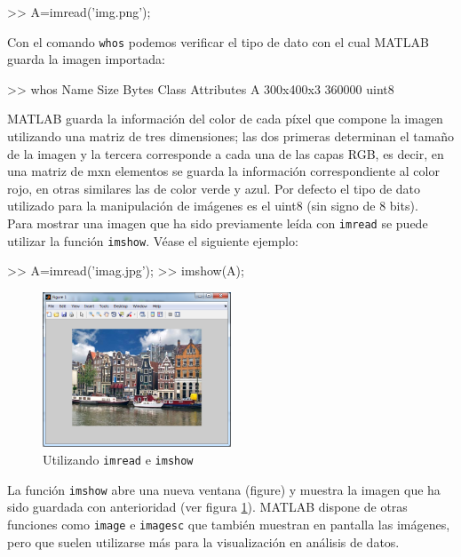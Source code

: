\begin{matlab}
>> A=imread('img.png');
\end{matlab}

Con el comando \texttt{whos} podemos verificar el tipo de dato con el
cual MATLAB guarda la imagen importada:

\begin{matlab}
>> whos
  Name        Size                Bytes  Class    Attributes
  A         300x400x3            360000  uint8    
\end{matlab}

MATLAB guarda la información del color de cada píxel que compone la
imagen utilizando una matriz de tres dimensiones; las dos primeras
determinan el tamaño de la imagen y la tercera corresponde a cada una de
las capas RGB, es decir, en una matriz de mxn elementos se guarda la
información correspondiente al color rojo, en otras similares las de
color verde y azul. Por defecto el tipo de dato utilizado para la
manipulación de imágenes es el uint8 (sin signo de 8 bits). \\

Para mostrar una imagen que ha sido previamente leída con \texttt{imread} se
puede utilizar la función \texttt{imshow}. Véase el siguiente ejemplo:

\begin{matlab}
>> A=imread('imag.jpg');
>> imshow(A);
\end{matlab}

\begin{figure}[htbp]
    \centering
    \includegraphics[width=0.5\textwidth]{images/ch7/holland_imshow.png}
    \caption{Utilizando \texttt{imread} e \texttt{imshow}}
    \label{fig:holland_imshow}
\end{figure}


La función \texttt{imshow} abre una nueva ventana (figure) y muestra la
imagen que ha sido guardada con anterioridad (ver figura \ref{fig:holland_imshow}). 
MATLAB dispone de otras funciones como \texttt{image} e \texttt{imagesc} que también muestran en pantalla las
imágenes, pero que suelen utilizarse más para la visualización en
análisis de datos.

